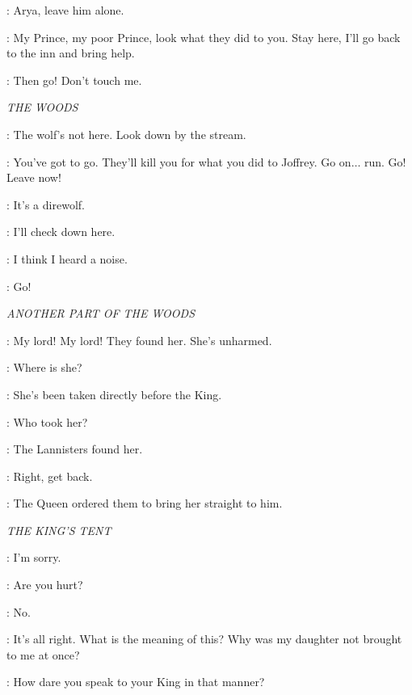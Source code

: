 \SANSA: Arya, leave him alone. 


\SANSA: My Prince, my poor Prince, look what they did to you. Stay here, I'll go back to the inn and bring help. 

\JOFFREY: Then go! Don't touch me. 

\scene

\textit{THE WOODS}


\SOLDIERa: The wolf's not here. Look down by the stream. 

\ARYA: You've got to go. They'll kill you for what you did to Joffrey. Go on$\ldots$ run. Go! Leave now! 

\SOLDIERb: It's a direwolf. 

\SOLDIERa: I'll check down here. 

\SOLDIERb: I think I heard a noise. 

\ARYA: Go! 


\scene

\textit{ANOTHER PART OF THE WOODS}


\JORY: My lord! My lord! They found her. She's unharmed. 

\NED: Where is she? 

\JORY: She's been taken directly before the King. 

\NED: Who took her? 

\JORY: The Lannisters found her. 

\NED: Right, get back. 

\JORY: The Queen ordered them to bring her straight to him. 


\scene

\textit{THE KING'S TENT}


\ARYA: I'm sorry. 

\NED: Are you hurt? 

\ARYA: No. 

\NED: It's all right. What is the meaning of this? Why was my daughter not brought to me at once? 

\CERSEI: How dare you speak to your King in that manner? 


